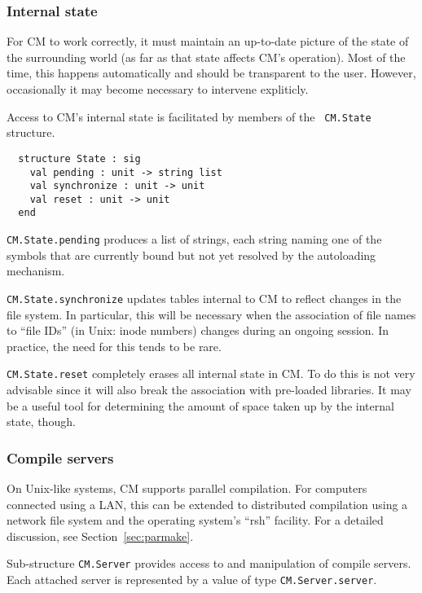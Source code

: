 \documentclass{article}
\begin{document}
\subsubsection*{Internal state}

For CM to work correctly, it must maintain an up-to-date picture of
the state of the surrounding world (as far as that state affects CM's
operation).  Most of the time, this happens automatically and should be
transparent to the user.  However, occasionally it may become
necessary to intervene expliticly.

Access to CM's internal state is facilitated by members of the {\tt
CM.State} structure.

\begin{verbatim}
  structure State : sig
    val pending : unit -> string list
    val synchronize : unit -> unit
    val reset : unit -> unit
  end
\end{verbatim}

{\tt CM.State.pending} produces a list of strings, each string naming
one of the symbols that are currently bound but not yet resolved by
the autoloading mechanism.

{\tt CM.State.synchronize} updates tables internal to CM to reflect
changes in the file system.  In particular, this will be necessary
when the association of file names to ``file IDs'' (in Unix: inode
numbers) changes during an ongoing session.  In practice, the need for
this tends to be rare.

{\tt CM.State.reset} completely erases all internal state in CM.  To
do this is not very advisable since it will also break the association
with pre-loaded libraries.  It may be a useful tool for determining
the amount of space taken up by the internal state, though.

\subsubsection*{Compile servers}

On Unix-like systems, CM supports parallel compilation.  For computers
connected using a LAN, this can be extended to distributed compilation
using a network file system and the operating system's ``rsh''
facility.  For a detailed discussion, see Section~\ref{sec:parmake}.

Sub-structure {\tt CM.Server} provides access to and manipulation of
compile servers.  Each attached server is represented by a value of
type {\tt CM.Server.server}.
\end{document}
